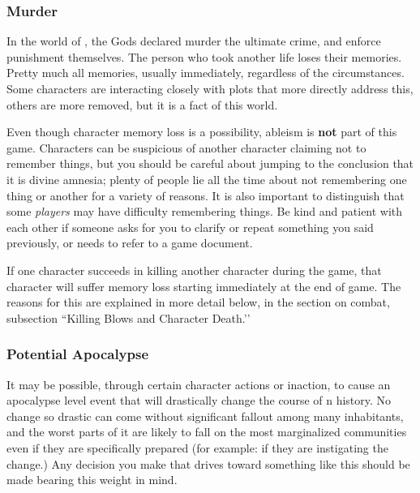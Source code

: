 \documentclass[sheet]{GL2020}
\begin{document}
\subsubsection{Murder}
In the world of \pEarth{}, the Gods declared murder the ultimate crime, and enforce punishment themselves. The person who took another life loses their memories. Pretty much all memories, usually immediately, regardless of the circumstances. Some characters are interacting closely with plots that more directly address this, others are more removed, but it is a fact of this world. 

Even though character memory loss is a possibility, ableism is \textbf{not} part of this game. Characters can be suspicious of another character claiming not to remember things, but you should be careful about jumping to the conclusion that it is divine amnesia; plenty of people lie all the time about not remembering one thing or another for a variety of reasons. It is also important to distinguish that some \emph{players} may have difficulty remembering things. Be kind and patient with each other if someone asks for you to clarify or repeat something you said previously, or needs to refer to a game document.

If one character succeeds in killing another character during the game, that character will suffer memory loss starting immediately at the end of game. The reasons for this are explained in more detail below, in the section on combat, subsection ``Killing Blows and Character Death.’’

\subsubsection{Potential Apocalypse}
It may be possible, through certain character actions or inaction, to cause an apocalypse level event that will drastically change the course of \pEarth{}n history. No change so drastic can come without significant fallout among many inhabitants, and the worst parts of it are likely to fall on the most marginalized communities even if they are specifically prepared (for example: if they are instigating the change.) Any decision you make that drives toward something like this should be made bearing this weight in mind.
\end{document}
